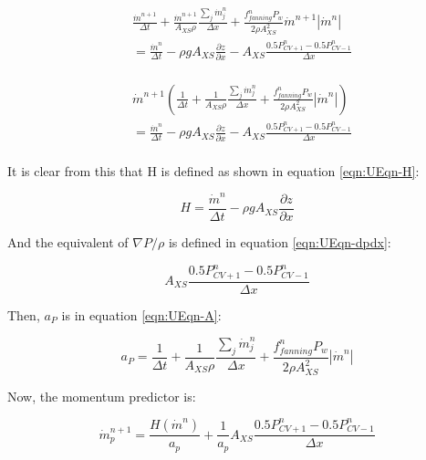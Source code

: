 \documentclass[masters]{ucbthesis}
\renewcommand{\_}{\kern-1.5pt\textunderscore\kern-1.5pt}
\begin{document}
\begin{align*}
	& 
	\frac{\dot{m}^{n+1} }{\Delta t}
	+ \frac{\dot{m}^{n+1}}{A_{XS} \rho} \frac{\sum_j \dot{m}_j^{n}}{\Delta x} 
	+\frac{f_{fanning}^n P_w}{2 \rho A_{XS}^2} \dot{m}^{n+1} |\dot{m}^n|  \\ 
	&
	=
	\frac{ \dot{m}^n}{\Delta t}
	- \rho g A_{XS} \frac{\partial z}{\partial x}
	- A_{XS} \frac{0.5 P^{n}_{CV+1}-0.5P^n_{CV-1}}{\Delta x} 
	\\
\end{align*}

\begin{align*}
	& 
	\dot{m}^{n+1}
	\left(
		\frac{1 }{\Delta t}
		+ \frac{1}{A_{XS} \rho} \frac{\sum_j \dot{m}_j^{n}}{\Delta x} 
		+\frac{f_{fanning}^n P_w}{2 \rho A_{XS}^2} |\dot{m}^n|  
	\right)
	\\ 
	&
	=
	\frac{ \dot{m}^n}{\Delta t}
	- \rho g A_{XS} \frac{\partial z}{\partial x}
	- A_{XS} \frac{0.5 P^{n}_{CV+1}-0.5P^n_{CV-1}}{\Delta x} 
	\\
\end{align*}


It is clear from this that H is defined as shown 
in equation \ref{eqn:UEqn-H}:

\begin{equation} \label{eqn:UEqn-H}
	H = \frac{ \dot{m}^n}{\Delta t}
	- \rho g A_{XS} \frac{\partial z}{\partial x}
\end{equation}

And the equivalent of $\nabla P/\rho$ is defined in 
equation \ref{eqn:UEqn-dpdx}:


\begin{equation} \label{eqn:UEqn-dpdx}
	A_{XS} \frac{0.5 P^{n}_{CV+1}-0.5P^n_{CV-1}}{\Delta x} 
\end{equation}

Then, $a_P$ is in equation \ref{eqn:UEqn-A}:

\begin{equation} \label{eqn:UEqn-A}
	a_P = \frac{1 }{\Delta t}
	+ \frac{1}{A_{XS} \rho} \frac{\sum_j \dot{m}_j^{n}}{\Delta x} 
	+\frac{f_{fanning}^n P_w}{2 \rho A_{XS}^2} |\dot{m}^n|  
\end{equation}

Now, the momentum predictor is:

\begin{equation} \label{eqn:momentum-predictor-1d-mass-flowrate}
	\dot{m}_p^{n+1} = \frac{H(\dot{m}^n)}{a_p} + 
	\frac{1}{a_p}
	A_{XS} \frac{0.5 P^{n}_{CV+1}-0.5P^n_{CV-1}}{\Delta x} 
\end{equation}
\end{document}
